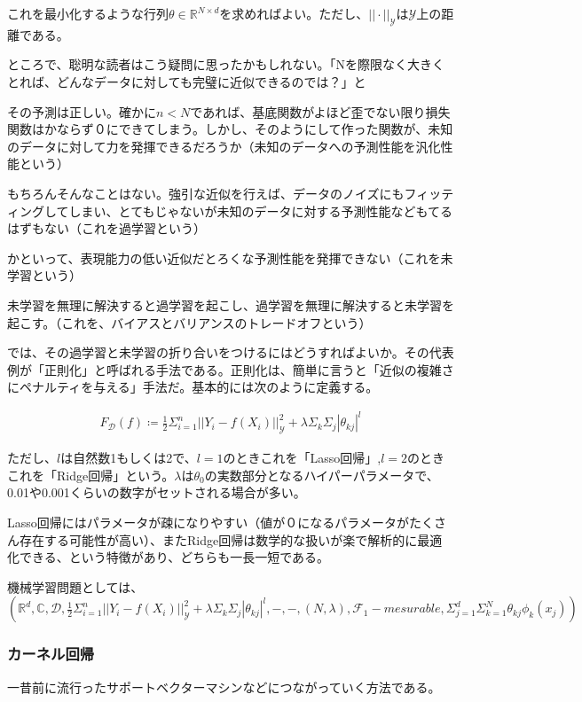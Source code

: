 \documentclass[dvipdfmx, a4paper]{jsarticle}
\begin{document}
これを最小化するような行列$\theta\in\mathbb{R}^{N\times d}$を求めればよい。ただし、$||\cdot||_\mathcal{Y}$は$\mathcal{Y}$上の距離である。


ところで、聡明な読者はこう疑問に思ったかもしれない。「Nを際限なく大きくとれば、どんなデータに対しても完璧に近似できるのでは？」と

その予測は正しい。確かに$n<N$であれば、基底関数がよほど歪でない限り損失関数はかならず０にできてしまう。しかし、そのようにして作った関数が、未知のデータに対して力を発揮できるだろうか（未知のデータへの予測性能を汎化性能という）

もちろんそんなことはない。強引な近似を行えば、データのノイズにもフィッティングしてしまい、とてもじゃないが未知のデータに対する予測性能などもてるはずもない（これを過学習という）

かといって、表現能力の低い近似だとろくな予測性能を発揮できない（これを未学習という）

未学習を無理に解決すると過学習を起こし、過学習を無理に解決すると未学習を起こす。（これを、バイアスとバリアンスのトレードオフという）

では、その過学習と未学習の折り合いをつけるにはどうすればよいか。その代表例が「正則化」と呼ばれる手法である。正則化は、簡単に言うと「近似の複雑さにペナルティを与える」手法だ。基本的には次のように定義する。

\begin{align}
F_\mathcal{D}(f)\coloneqq \frac{1}{2}\Sigma^n_{i=1}||Y_i-f(X_i)||_\mathcal{Y}^2+\lambda\Sigma_k\Sigma_j|\theta_{kj}|^l
\end{align}

ただし、$l$は自然数1もしくは2で、$l=1$のときこれを「Lasso回帰」,$l=2$のときこれを「Ridge回帰」という。$\lambda$は$\theta_0$の実数部分となるハイパーパラメータで、0.01や0.001くらいの数字がセットされる場合が多い。

Lasso回帰にはパラメータが疎になりやすい（値が０になるパラメータがたくさん存在する可能性が高い）、またRidge回帰は数学的な扱いが楽で解析的に最適化できる、という特徴があり、どちらも一長一短である。

機械学習問題としては、$(\mathbb{R}^d,\mathbb{C},\mathcal{D},\frac{1}{2}\Sigma^n_{i=1}||Y_i-f(X_i)||_\mathcal{Y}^2+\lambda\Sigma_k\Sigma_j|\theta_{kj}|^l,-,-,(N,\lambda),\mathcal{F}_1-mesurable,\Sigma^d_{j=1}\Sigma^N_{k=1} \theta_{kj}\phi_k(x_j))$


\subsubsection{カーネル回帰}
一昔前に流行ったサポートベクターマシンなどにつながっていく方法である。
\end{document}
